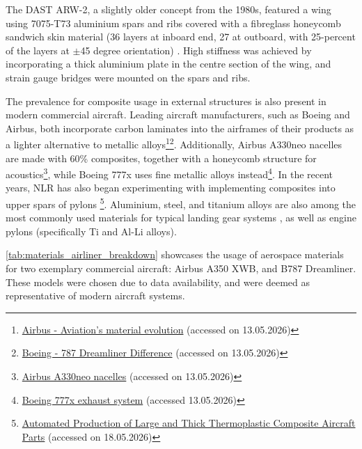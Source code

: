 The DAST ARW-2, a slightly older concept from the 1980s, featured a wing using 7075-T73 aluminium spars and ribs covered with a fibreglass honeycomb sandwich skin material (36 layers at inboard end, 27 at outboard, with 25-percent of the layers at $\pm$45 degree orientation) \cite{Eckstrom1986ARW2}. High stiffness was achieved by incorporating a thick aluminium plate in the centre section of the wing, and strain gauge bridges were mounted on the spars and ribs.

The prevalence for composite usage in external structures is also present in modern commercial aircraft. Leading aircraft manufacturers, such as Boeing and Airbus, both incorporate carbon laminates into the airframes of their products as a lighter alternative to metallic alloys\footnote{\label{url:cfrp_airbus}\href{https://www.airbus.com/en/newsroom/news/2017-02-aviations-material-evolution}{Airbus - Aviation's material evolution} (accessed on 13.05.2026)}\footnote{\label{url:cfrp_boeing}\href{https://www.boeing.com/content/dam/boeing/boeingdotcom/features/innovation-quarterly/2024/IQ-2024-Q3-full.pdf}{Boeing - 787 Dreamliner Difference} (accessed on 13.05.2026)}. Additionally, Airbus A330neo nacelles are made with 60\% composites, together with a honeycomb structure for acoustics\footnote{\href{https://www.safran-group.com/products-services/airbus-a330neo-nacelles}{Airbus A330neo nacelles} (accessed on 13.05.2026)}, while Boeing 777x uses fine metallic alloys instead\footnote{\href{https://www.safran-group.com/products-services/boeing-777x-exhaust-system}{Boeing 777x exhaust system} (accessed 13.05.2026)}. In the recent years, NLR has also began experimenting with implementing composites into upper spars of pylons    \footnote{\href{https://www.toraytac.com/newsroom/story/HelI/Thermoplastic-Upper-Spar-for-an-Aircraft-Engine-Pylon}{Automated Production of Large and Thick Thermoplastic Composite Aircraft Parts} (accessed on 18.05.2026)}. Aluminium, steel, and titanium alloys are also among the most commonly used materials for typical landing gear systems \cite{typicallandinggear}, as well as engine pylons (specifically Ti and Al-Li alloys)\cite{TiAl_pylon_materials}. 

\autoref{tab:materials_airliner_breakdown} showcases the usage of aerospace materials for two exemplary commercial aircraft: Airbus A350 XWB, and B787 Dreamliner. These models were chosen due to data availability, and were deemed as representative of modern aircraft systems.

